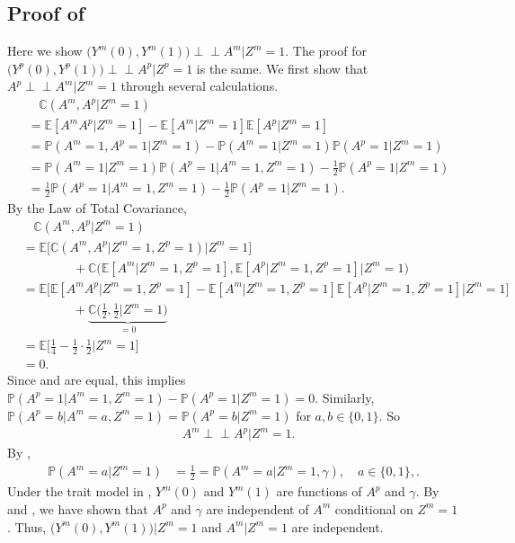 \documentclass[12pt]{extarticle}
\newcommand{\ind}{\perp\!\!\!\!\perp}
\newcommand{\pp}{\mathbb{P}}
\newcommand{\E}{\mathbb{E}}
\newcommand{\cV}{\mathbb{C}}
\begin{document}
\subsection{Proof of } \label{app:cind}

Here we show $\Big(Y^m(0),Y^m(1)\Big)\ind A^m | Z^m=1$. The proof for $\Big(Y^p(0),Y^p(1)\Big)\ind A^p | Z^p=1$ is the same. We first show that $A^p \ind A^m |Z^m=1$ through several calculations. 
{\allowdisplaybreaks 
\begin{align}
& ~~~~ \cV(A^m,A^p|Z^m=1) \nonumber \\
&= \E[A^m A^p|Z^m=1] - \E[A^m|Z^m=1]\E[A^p|Z^m=1] \nonumber \\
&= \pp(A^m=1,A^p=1|Z^m=1) - \pp(A^m=1|Z^m=1) \pp(A^p=1|Z^m=1) \nonumber \\
&= \pp(A^m=1|Z^m=1)\pp(A^p=1|A^m=1,Z^m=1) - \frac{1}{2}\pp(A^p=1|Z^m=1) \nonumber \\
&= \frac{1}{2}\pp(A^p=1|A^m=1,Z^m=1) - \frac{1}{2}\pp(A^p=1|Z^m=1). \tag{A2.a} \label{eq:a2a} 
\end{align}}
By the Law of Total Covariance,
{\allowdisplaybreaks 
\begin{align}
& ~~~~ \cV(A^m,A^p|Z^m=1)  \nonumber \\
&= \E\Big[\cV(A^m,A^p|Z^m=1,Z^p=1)\Big|Z^m=1\Big] \nonumber \\
& \qquad \qquad + \cV\Big(\E[A^m|Z^m=1,Z^p=1],\E[A^p|Z^m=1,Z^p=1]\Big|Z^m=1\Big) \nonumber \\
&= \E\Big[\E[A^mA^p|Z^m=1,Z^p=1]-\E[A^m|Z^m=1,Z^p=1]\E[A^p|Z^m=1,Z^p=1]\Big|Z^m=1\Big] \nonumber \\ 
& \qquad \qquad + \underbrace{\cV\Big(\frac{1}{2},\frac{1}{2}\Big|Z^m=1\Big)}_{=0} \nonumber \\
&= \E\Big[\frac{1}{4}-\frac{1}{2}\cdot \frac{1}{2}\Big|Z^m=1\Big] \nonumber \\
&= 0. \tag{A2.b} \label{eq:a2b}
\end{align}}
Since  and  are equal, this implies $\pp(A^p=1|A^m=1,Z^m=1) - \pp(A^p=1|Z^m=1) = 0$. Similarly, $\pp(A^p=b|A^m=a,Z^m=1) = \pp(A^p=b|Z^m=1)$ for $a,b\in \{0,1\}$. So 
\begin{align}
& A^m \ind A^p |Z^m=1. \tag{A2.c} \label{eq:a2c}
\end{align} 
By , 
\begin{align}
\pp(A^m=a|Z^m=1) &= \frac{1}{2}=\pp(A^m=a|Z^m=1,\gamma), \quad a\in \{0,1\}, \tag{A2.d}. \label{eq:a2d}
\end{align} 
Under the trait model in , $Y^m(0)$ and $Y^m(1)$ are functions of $A^p$ and $\gamma$. By  and , we have shown that $A^p$ and $\gamma$ are independent of $A^m$ conditional on $Z^m=1$. Thus, $\big(Y^m(0),Y^m(1)\big)|Z^m=1$ and $A^m|Z^m=1$ are independent.
\end{document}
